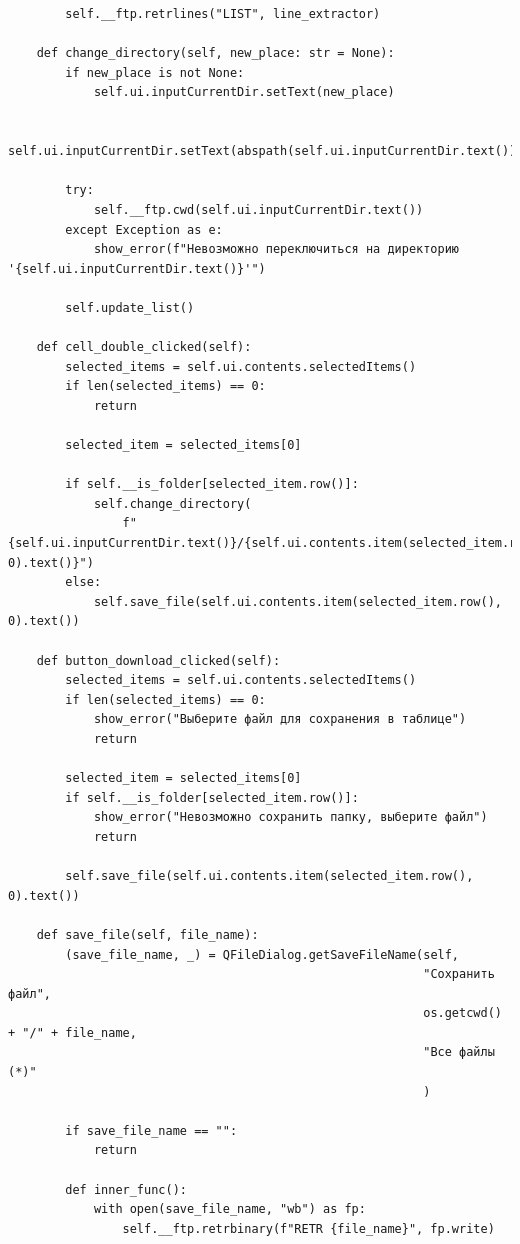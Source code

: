 \documentclass[a4paper,14pt]{extarticle}
\begin{document}
\begin{verbatim}
        self.__ftp.retrlines("LIST", line_extractor)

    def change_directory(self, new_place: str = None):
        if new_place is not None:
            self.ui.inputCurrentDir.setText(new_place)

        self.ui.inputCurrentDir.setText(abspath(self.ui.inputCurrentDir.text()))

        try:
            self.__ftp.cwd(self.ui.inputCurrentDir.text())
        except Exception as e:
            show_error(f"Невозможно переключиться на директорию '{self.ui.inputCurrentDir.text()}'")

        self.update_list()

    def cell_double_clicked(self):
        selected_items = self.ui.contents.selectedItems()
        if len(selected_items) == 0:
            return

        selected_item = selected_items[0]

        if self.__is_folder[selected_item.row()]:
            self.change_directory(
                f"{self.ui.inputCurrentDir.text()}/{self.ui.contents.item(selected_item.row(), 0).text()}")
        else:
            self.save_file(self.ui.contents.item(selected_item.row(), 0).text())

    def button_download_clicked(self):
        selected_items = self.ui.contents.selectedItems()
        if len(selected_items) == 0:
            show_error("Выберите файл для сохранения в таблице")
            return

        selected_item = selected_items[0]
        if self.__is_folder[selected_item.row()]:
            show_error("Невозможно сохранить папку, выберите файл")
            return

        self.save_file(self.ui.contents.item(selected_item.row(), 0).text())

    def save_file(self, file_name):
        (save_file_name, _) = QFileDialog.getSaveFileName(self,
                                                          "Сохранить файл",
                                                          os.getcwd() + "/" + file_name,
                                                          "Все файлы (*)"
                                                          )

        if save_file_name == "":
            return

        def inner_func():
            with open(save_file_name, "wb") as fp:
                self.__ftp.retrbinary(f"RETR {file_name}", fp.write)


\end{verbatim}
\end{document}

